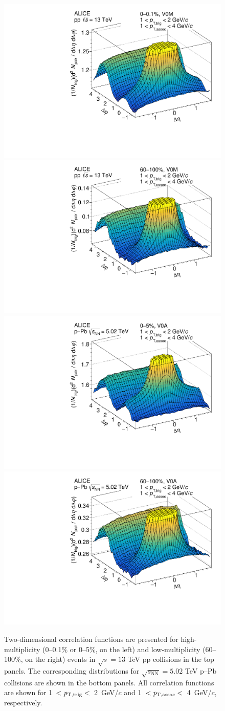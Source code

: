 \begin{figure}[h!]
		\includegraphics[width=0.5 \textwidth]{figures/FIG1_ppHigh.pdf} 
		\includegraphics[width=0.5 \textwidth]{figures/FIG1_ppLow.pdf} 
  		\includegraphics[width=0.5 \textwidth]{figures/FIG1_pPbHigh.pdf}
		\includegraphics[width=0.5 \textwidth]{figures/FIG1_pPbLow.pdf}
\caption{Two-dimensional correlation functions are presented for high-multiplicity (0--0.1\% or 0--5\%, on the left) and low-multiplicity (60--100\%, on the right) events in $\sqrt{s}=13$ TeV pp collisions in the top panels. The corresponding distributions for $\sqrt{s_{\mathrm{NN}}}=5.02$ TeV p--Pb collisions are shown in the bottom panels. All correlation functions are shown for 1~$<\it{p}_{\rm{T,trig}}<$~2~GeV/$c$ and 1~$<\it{p}_{\rm{T,assoc}}<$~4~GeV/$c$, respectively.}
\label{fig:doubleridge}
\end{figure}

